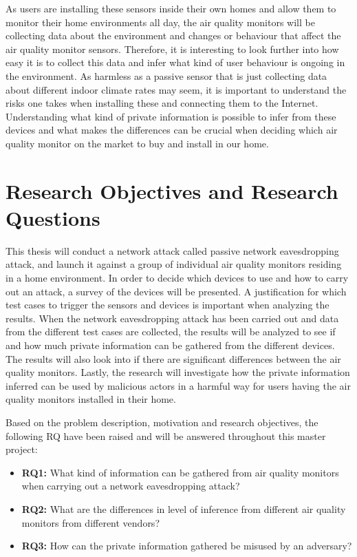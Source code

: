 As users are installing these sensors inside their own homes and allow them to monitor their home environments all day, the air quality monitors will be collecting data about the environment and changes or behaviour that affect the air quality monitor sensors. Therefore, it is interesting to look further into how easy it is to collect this data and infer what kind of user behaviour is ongoing in the environment. As harmless as a passive sensor that is just collecting data about different indoor climate rates may seem, it is important to understand the risks one takes when installing these and connecting them to the Internet. Understanding what kind of private information is possible to infer from these devices and what makes the differences can be crucial when deciding which air quality monitor on the market to buy and install in our home.

\section{Research Objectives and Research Questions}
This thesis will conduct a network attack called passive network eavesdropping attack, and launch it against a group of individual air quality monitors residing in a home environment. In order to decide which devices to use and how to carry out an attack, a survey of the devices will be presented. A justification for which test cases to trigger the sensors and devices is important when analyzing the results. When the network eavesdropping attack has been carried out and data  from the different test cases are collected, the results will be analyzed to see if and how much private information can be gathered from the different devices. The results will also look into if there are significant differences between the air quality monitors. Lastly, the research will investigate how the private information inferred can be used by malicious actors in a harmful way for users having the air quality monitors installed in their home.

Based on the problem description, motivation and research objectives, the following \gls{RQ} have been raised and will be answered throughout this master project:
\begin{itemize}
    \item 
    \textbf{\gls{RQ}1:} What kind of information can be gathered from air quality monitors when carrying out a network eavesdropping attack?\\
    \item 
    \textbf{\gls{RQ}2:} What are the differences in level of inference from different air quality monitors from different vendors?\\
    \item 
    \textbf{\gls{RQ}3:} How can the private information gathered be misused by an adversary?\\
\end{itemize}

